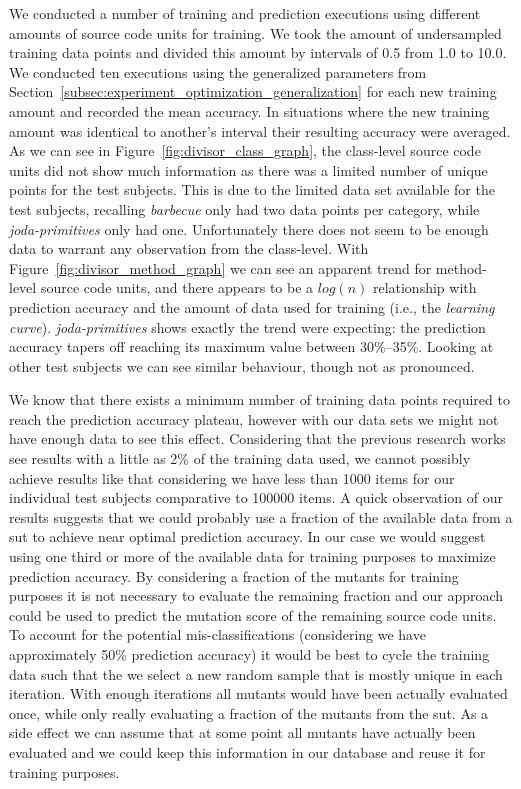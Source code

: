 We conducted a number of training and prediction executions using different amounts of source code units for training. We took the amount of undersampled training data points and divided this amount by intervals of 0.5 from 1.0 to 10.0. We conducted ten executions using the generalized parameters from Section~\ref{subsec:experiment_optimization_generalization} for each new training amount and recorded the mean accuracy. In situations where the new training amount was identical to another's interval their resulting accuracy were averaged. As we can see in Figure~\ref{fig:divisor_class_graph}, the class-level source code units did not show much information as there was a limited number of unique points for the test subjects. This is due to the limited data set available for the test subjects, recalling \emph{barbecue} only had two data points per category, while \emph{joda-primitives} only had one. Unfortunately there does not seem to be enough data to warrant any observation from the class-level. With Figure~\ref{fig:divisor_method_graph} we can see an apparent trend for method-level source code units, and there appears to be a $log(n)$ relationship with prediction accuracy and the amount of data used for training (i.e., the \emph{learning curve}). \emph{joda-primitives} shows exactly the trend were expecting: the prediction accuracy tapers off reaching its maximum value between 30\%--35\%. Looking at other test subjects we can see similar behaviour, though not as pronounced.

We know that there exists a minimum number of training data points required to reach the prediction accuracy plateau, however with our data sets we might not have enough data to see this effect. Considering that the previous research works see results with a little as 2\% of the training data used, we cannot possibly achieve results like that considering we have less than 1000 items for our individual test subjects comparative to 100000 items. A quick observation of our results suggests that we could probably use a fraction of the available data from a \gls{sut} to achieve near optimal prediction accuracy. In our case we would suggest using one third or more of the available data for training purposes to maximize prediction accuracy. By considering a fraction of the mutants for training purposes it is not necessary to evaluate the remaining fraction and our approach could be used to predict the mutation score of the remaining source code units. To account for the potential mis-classifications (considering we have approximately 50\% prediction accuracy) it would be best to cycle the training data such that the we select a new random sample that is mostly unique in each iteration. With enough iterations all mutants would have been actually evaluated once, while only really evaluating a fraction of the mutants from the \gls{sut}. As a side effect we can assume that at some point all mutants have actually been evaluated and we could keep this information in our database and reuse it for training purposes.


